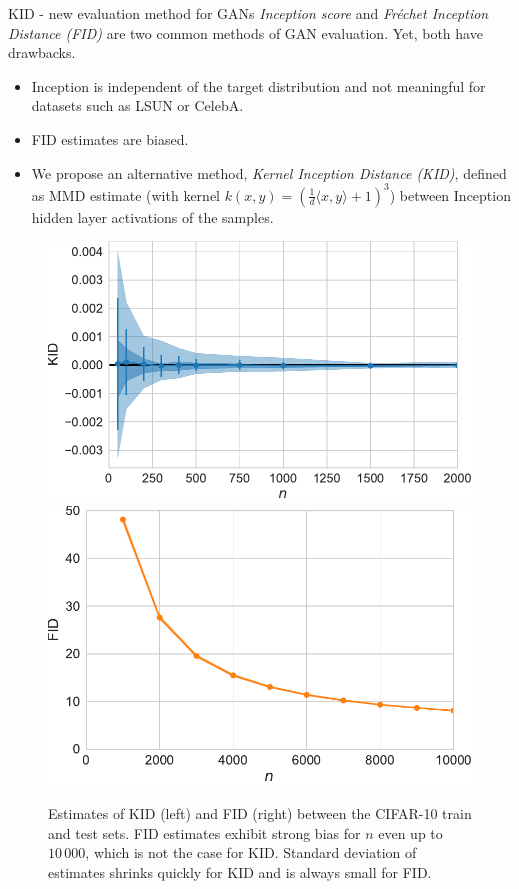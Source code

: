 \documentclass[xcolor={table}]{beamer}
\begin{document}
\begin{frame}{}
\begin{columns}[T, totalwidth=\textwidth]
  \begin{column}{.32\textwidth}
    \begin{block}{KID - new evaluation method for GANs}
      \emph{Inception score} and \emph{Fr\'echet Inception Distance (FID)} are two common methods 
      of GAN evaluation. Yet, both have drawbacks. 
      \begin{itemize}
        \item Inception is independent of the target distribution and not meaningful for datasets such as LSUN or CelebA.
        \item FID estimates are biased.
        \item We propose an alternative method, \emph{Kernel Inception Distance (KID)}, defined as 
      MMD estimate (with kernel $k(x,y) = \left(\frac{1}{d}\langle x, y\rangle + 1\right)^3$)
      between Inception hidden layer activations of the samples. 
      \end{itemize}
    \end{block}
    \begin{figure}
      \centering
      \includegraphics[width=.48\columnwidth]{figs/mmd-unbiased.pdf}\quad
      \includegraphics[width=.48\columnwidth]{figs/fid-bias.pdf}
      \caption{Estimates of KID (left) and FID (right) between the CIFAR-10 train and test sets. FID estimates 
        exhibit strong bias for $n$ even up to $10\,000$, which is not the case for KID. 
        Standard deviation of estimates shrinks quickly for KID and is always small for FID.}  %

\end{figure}
\end{column}
\end{columns}
\end{frame}
\end{document}
